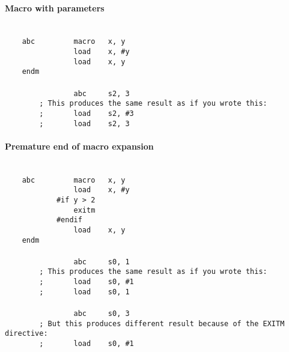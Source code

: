         \paragraph{Macro with parameters}
        ~\\
        \verb'    abc         macro   x, y'\\
        \verb'                load    x, #y'\\
        \verb'                load    x, y'\\
        \verb'    endm'\\
        \verb''\\
        \verb'                abc     s2, 3'\\
        \verb'        ; This produces the same result as if you wrote this:'\\
        \verb'        ;       load    s2, #3'\\
        \verb'        ;       load    s2, 3'

        \paragraph{Premature end of macro expansion}
        ~\\
        \verb'    abc         macro   x, y'\\
        \verb'                load    x, #y'\\
        \verb'            #if y > 2'\\
        \verb'                exitm'\\
        \verb'            #endif'\\
        \verb'                load    x, y'\\
        \verb'    endm'\\
        \verb''\\
        \verb'                abc     s0, 1'\\
        \verb'        ; This produces the same result as if you wrote this:'\\
        \verb'        ;       load    s0, #1'\\
        \verb'        ;       load    s0, 1'\\
        \verb''\\
        \verb'                abc     s0, 3'\\
        \verb'        ; But this produces different result because of the EXITM directive:'\\
        \verb'        ;       load    s0, #1'\\

